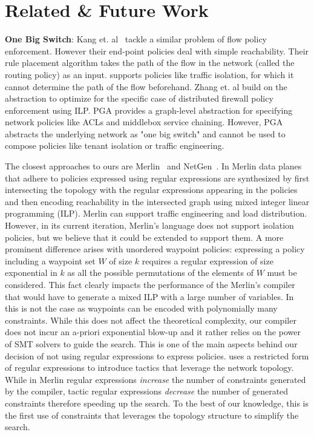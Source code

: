 \section{Related \& Future Work} \label{sec:relatedwork}
\textbf{One Big Switch}: Kang et. al~\cite{oneswitch} tackle a 
similar problem of flow policy
enforcement. However their end-point policies deal with simple
reachability. Their rule placement algorithm takes the path of the
flow in the network  (called the routing policy) as an input. %
\Name supports policies like traffic isolation, 
for which it cannot determine the path of the flow
beforehand. %
Zhang et. al \cite{distfirewall} build on the
\cite{oneswitch} abstraction to optimize for the specific case of
distributed firewall policy enforcement using ILP.  PGA \cite{pga} provides
a graph-level abstraction for specifying network policies like ACLs and
middlebox service chaining. However, PGA abstracts the underlying
network as "one big switch" and cannot be used to compose policies like
tenant isolation or traffic engineering.

The closest approaches to ours are Merlin~\cite{merlin} and
NetGen~\cite{netgen}.  In Merlin data planes that adhere to policies
expressed using regular expressions are synthesized by first
intersecting the topology with the regular expressions appearing in
the policies and then encoding reachability in the intersected graph
using mixed integer linear programming (ILP).
Merlin can support traffic engineering and load distribution. 
However, in its current iteration, 
Merlin's language does not support isolation policies, but we believe
that it could be extended to support them.  
A more prominent
difference arises with unordered waypoint policies: expressing a
policy including a waypoint set $W$ of size $k$ requires a regular
expression of size exponential in $k$ as all the possible permutations
of the elements of $W$ must be considered. This fact clearly impacts the performance of
the Merlin's compiler that would have to generate a mixed ILP with a
large number of variables.  In \Name this is not the case as waypoints
can be encoded with polynomially many constraints.  While this does
not affect the theoretical complexity, our compiler does not incur
an a-priori exponential blow-up and it rather relies on the power
of SMT solvers to guide the search.  This is one of the main aspects
behind our decision of not using regular expressions to express
policies.  \Name uses a restricted form of regular expressions to
introduce tactics that leverage the network topology.  While in Merlin
regular expressions \emph{increase} the number of constraints
generated by the compiler, tactic regular expressions \emph{decrease}
the number of generated constraints therefore speeding up the search.
To the best of our knowledge, this is the first use of constraints
that leverages the topology structure to simplify the search.

